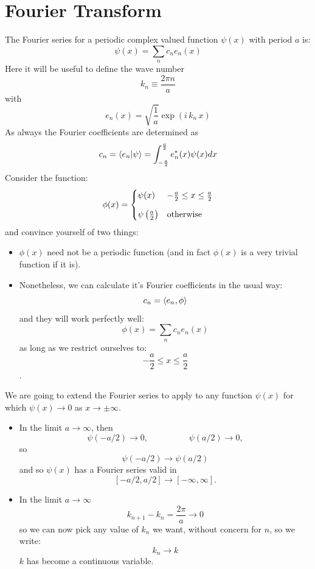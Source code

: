 \documentclass[12pt]{book}
\begin{document}
\section{Fourier Transform}

The Fourier series for a periodic complex valued function $\psi(x)$ with period $a$ is:
\begin{equation*}
\psi(x) = \sum_n c_n e_n(x)
\end{equation*}
Here it will be useful to define the wave number
\begin{equation}
k_n \equiv \frac{2 \pi n}{a}
\end{equation}
with 
$$e_n(x) = \sqrt{\frac{1}{a}}\exp( i\, k_n \, x)$$
As always the Fourier coefficients are determined as 
\begin{equation*}
c_n = \braket{e_n | \psi} = \int_{-\frac{a}{2}}^{\frac{a}{2}} e_n^*(x) \psi(x)  dx
\end{equation*}
Consider the function:
\begin{equation}
\phi(x) =
\begin{cases}
   \psi(x)                      & -\frac{a}{2} \leq x \leq \frac{a}{2} \\[8pt]
   \psi\left(\frac{a}{2}\right) & {\rm otherwise} \\
\end{cases}
\end{equation}
and convince yourself of two things:
\begin{itemize}
 \item $\phi(x)$ need not be a periodic function (and in fact $\phi(x)$ is a very trivial function if it is).
 \item Nonetheless, we can calculate it's Fourier coefficients in the usual way:
$$c_n = \braket{e_n, \phi}$$
and they will work perfectly well:
$$\phi(x) = \sum_n c_n e_n(x)$$
as long as we restrict ourselves to:
$$-\frac{a}{2} \leq x \leq \frac{a}{2}$$.
\end{itemize}   
We are going to extend the Fourier series to apply to any function $\psi(x)$ for which $\psi(x) \to 0$ as $x \to \pm\infty$.
\begin{itemize}
 \item In the limit $a \to \infty$, then 
 $$\psi(-a/2) \to 0, \hspace{2cm } \psi(a/2) \to 0,$$
 so
 $$\psi(-a/2) \to \psi(a/2)$$
 and so $\psi(x)$ has a Fourier series valid in 
 $$[-a/2,a/2] \to [-\infty,\infty].$$
 \item In the limit $a \to \infty$
 $$k_{n+1}-k_n = \frac{2\pi}{a} \to 0$$
 so we can now pick any value of $k_n$ we want, without concern for $n$, so we write:
 $$k_n \to k$$
 $k$ has become a continuous variable.
\end{itemize}
\end{document}

